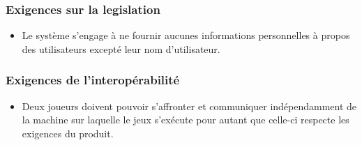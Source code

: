         \subsubsection{Exigences sur la legislation}
        \begin{itemize}
            \renewcommand\labelitemi{\textbullet}
            \item Le système s'engage à ne fournir aucunes informations personnelles à propos des utilisateurs excepté leur nom d'utilisateur. 
        \end{itemize}
        \subsubsection{Exigences de l'interopérabilité}
        \begin{itemize}
            \renewcommand\labelitemi{\textbullet}
            \item Deux joueurs doivent pouvoir s'affronter et communiquer indépendamment de la machine sur laquelle le jeux s'exécute pour autant que celle-ci respecte les exigences du produit.
        \end{itemize}